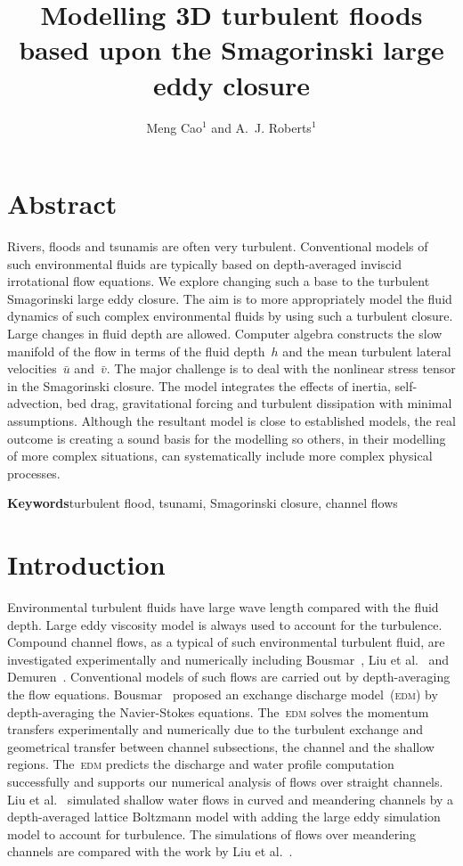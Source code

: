 \documentclass[a5paper,12pt]{article}
\title{Modelling 3D turbulent floods based upon the Smagorinski large eddy closure}
\author{Meng Cao$^1$ and A.~J. Roberts$^1$}
\affiliation{$^1$School of Mathematical Sciences\\
                University of Adelaide, South Australia 5005, Australia\\[5pt]
            }
\begin{document}
    
\maketitle

\section{Abstract}
Rivers, floods and tsunamis are often very turbulent. Conventional models of such environmental fluids are typically based on depth-averaged inviscid irrotational flow equations. We explore changing such a base to the turbulent Smagorinski large eddy closure. The aim is to more appropriately model the fluid dynamics of such complex environmental fluids by using such a turbulent closure. Large changes in fluid depth are allowed. Computer algebra constructs the slow manifold of the flow in terms of the fluid depth~$h$ and the mean turbulent lateral velocities~$\bar u$ and~$\bar v$. The major challenge is to deal with the nonlinear stress tensor in the Smagorinski closure. The model integrates the effects of inertia, self-advection, bed drag, gravitational forcing and turbulent dissipation with minimal assumptions. Although the resultant model is close to established models, the real outcome is creating a sound basis for the modelling so others, in their modelling of more complex situations, can systematically include more complex physical processes.

\textbf{Keywords}\quad turbulent flood, tsunami, Smagorinski closure, channel flows

\section{Introduction}

Environmental turbulent fluids have large wave length compared with the fluid depth.
Large eddy viscosity model is always used to account for the turbulence.
Compound channel flows, as a typical of such environmental turbulent fluid, are investigated experimentally and numerically including Bousmar~\cite{Bousmar2002}, Liu et al.~\cite{Liu2009} and Demuren~\cite{Demuren1993}.
Conventional models of such flows are carried out by depth-averaging the flow equations. 
Bousmar~\cite{Bousmar2002} proposed an exchange discharge model~(\textsc{edm}) by depth-averaging the Navier-Stokes equations.
The~\textsc{edm} solves the momentum transfers experimentally and numerically due to the turbulent exchange and geometrical transfer between channel subsections, the channel and the shallow regions.
The~\textsc{edm} predicts the discharge and water profile computation successfully and supports our numerical analysis of flows over straight channels. 
Liu et al.~\cite{Liu2009} simulated shallow water flows in curved and meandering channels by a depth-averaged lattice Boltzmann model with adding the large eddy simulation model to account for turbulence.
The simulations of flows over meandering channels are compared  with the work by Liu et al.~\cite{Liu2009}. 
\end{document}
